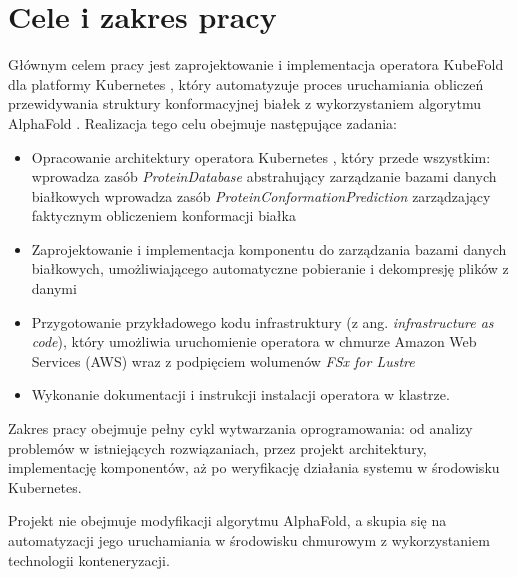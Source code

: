 \section{Cele i zakres pracy}

Głównym celem pracy jest zaprojektowanie i implementacja operatora KubeFold dla platformy Kubernetes \cite{kubernetes}, który automatyzuje proces uruchamiania obliczeń przewidywania struktury konformacyjnej białek z wykorzystaniem algorytmu AlphaFold \cite{alphafold3}.
Realizacja tego celu obejmuje następujące zadania:

\begin{itemize}
    \item Opracowanie architektury operatora Kubernetes \cite{k8s_operators}, który przede wszystkim:
    \subitem wprowadza zasób \textit{ProteinDatabase} abstrahujący zarządzanie bazami danych białkowych
    \subitem wprowadza zasób \textit{ProteinConformationPrediction} zarządzający faktycznym obliczeniem konformacji białka
    \item Zaprojektowanie i implementacja komponentu do zarządzania bazami danych białkowych, umożliwiającego automatyczne pobieranie i dekompresję plików z danymi
    \item Przygotowanie przykładowego kodu infrastruktury (z ang. \textit{infrastructure as code}), który umożliwia uruchomienie operatora w chmurze Amazon Web Services (AWS) wraz z podpięciem wolumenów \textit{FSx for Lustre}
    \item Wykonanie dokumentacji i instrukcji instalacji operatora w klastrze.
\end{itemize}

Zakres pracy obejmuje pełny cykl wytwarzania oprogramowania: od analizy problemów w istniejących rozwiązaniach, przez projekt architektury, implementację komponentów, aż po weryfikację działania systemu w środowisku Kubernetes.

Projekt nie obejmuje modyfikacji algorytmu AlphaFold, a skupia się na automatyzacji jego uruchamiania w środowisku chmurowym z wykorzystaniem technologii konteneryzacji.
